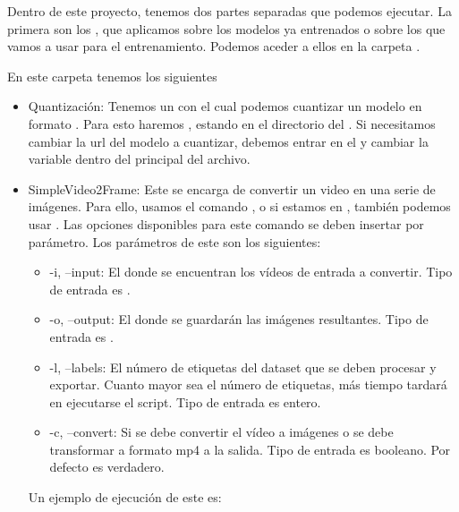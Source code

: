 Dentro de este proyecto, tenemos dos partes separadas que podemos ejecutar. La primera son los , que aplicamos sobre los modelos ya entrenados o sobre los  que vamos a usar para el entrenamiento. Podemos aceder a ellos en la carpeta .

En este carpeta tenemos los siguientes 

\begin{itemize}
  \item Quantización: Tenemos un  con el cual podemos cuantizar un modelo en formato . Para esto haremos , estando en el directorio del .
        Si necesitamos cambiar la url del modelo a cuantizar, debemos entrar en el  y cambiar la variable dentro del  principal del archivo.

  \item SimpleVideo2Frame: Este  se encarga de convertir un video en una serie de imágenes. Para ello, usamos el comando , o si estamos en , también podemos usar . Las opciones disponibles para este comando se deben insertar por parámetro. Los parámetros de este  son los siguientes:
        \begin{itemize}
          \item -i, --input: El  donde se encuentran los vídeos de entrada a convertir. Tipo de entrada es .
          \item -o, --output: El  donde se guardarán las imágenes resultantes. Tipo de entrada es .
          \item -l, --labels: El número de etiquetas del dataset que se deben procesar y exportar. Cuanto mayor sea el número de etiquetas, más tiempo tardará en ejecutarse el script. Tipo de entrada es entero.
          \item -c, --convert: Si se debe convertir el vídeo a imágenes o se debe transformar a formato mp4 a la salida. Tipo de entrada es booleano. Por defecto es verdadero.
        \end{itemize}

        Un ejemplo de ejecución de este  es:  


\end{itemize}
